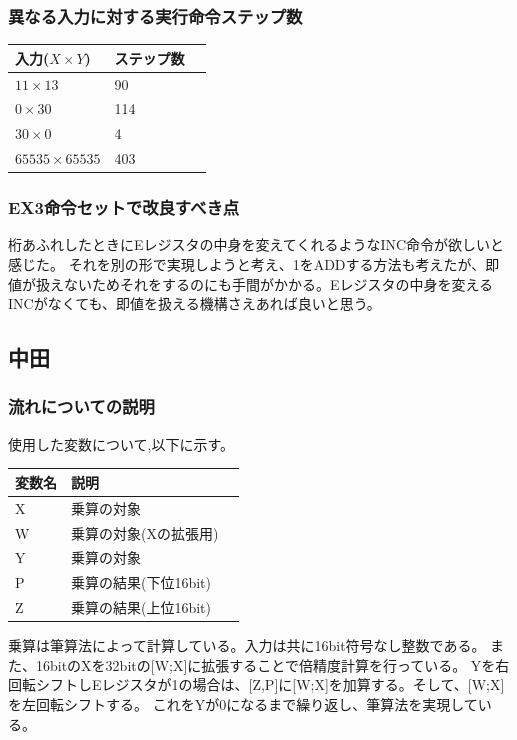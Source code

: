\documentclass[dvipdfmx,12pt]{jreport}
\begin{document}
\subsubsection{異なる入力に対する実行命令ステップ数}
\begin{table}[h]
  \begin{tabular}{|l|l|l|} \hline
    入力($X \times Y$) & ステップ数 \\ \hline
    $11 \times 13$ & 90 \\ \hline
    $0 \times 30$ & 114 \\ \hline
    $30 \times 0$ & 4 \\ \hline
    $65535 \times 65535$ & 403 \\ \hline
  \end{tabular}
\end{table}

\subsubsection{EX3命令セットで改良すべき点}
桁あふれしたときにEレジスタの中身を変えてくれるようなINC命令が欲しいと感じた。
それを別の形で実現しようと考え、1をADDする方法も考えたが、即値が扱えないためそれをするのにも手間がかかる。Eレジスタの中身を変えるINCがなくても、即値を扱える機構さえあれば良いと思う。

\subsection*{中田}
\subsubsection*{流れについての説明}
使用した変数について,以下に示す。
\begin{table}[h]
  \begin{tabular}{|l|l|l|} \hline
    変数名 & 説明 \\ \hline
    X & 乗算の対象 \\ \hline
    W & 乗算の対象(Xの拡張用) \\ \hline
    Y& 乗算の対象 \\ \hline
    P & 乗算の結果(下位16bit) \\ \hline
    Z & 乗算の結果(上位16bit) \\ \hline
  \end{tabular}
\end{table}

乗算は筆算法によって計算している。入力は共に16bit符号なし整数である。
また、16bitのXを32bitの[W;X]に拡張することで倍精度計算を行っている。
Yを右回転シフトしEレジスタが1の場合は、[Z,P]に[W;X]を加算する。そして、[W;X]を左回転シフトする。
これをYが0になるまで繰り返し、筆算法を実現している。　\\
\end{document}
